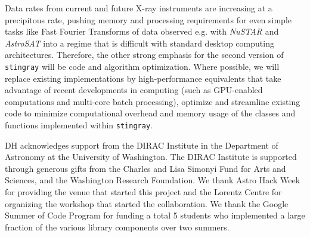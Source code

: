 \documentclass[twocolumn]{aastex62}
\newcommand{\stingray}{\texttt{stingray}\xspace}
\begin{document}
Data rates from current and future X-ray instruments are increasing at a precipitous rate, pushing memory and processing requirements for even simple tasks like Fast Fourier Transforms of data observed e.g. with \textit{NuSTAR} and \textit{AstroSAT} \citep{singh2014} into a regime that is difficult with standard desktop computing architectures. Therefore, the other strong emphasis for the second version of \stingray will be code and algorithm optimization. Where possible, we will replace existing implementations by high-performance equivalents that take advantage of recent developments in computing (such as GPU-enabled computations and multi-core batch processing), optimize and streamline existing code to minimize computational overhead and memory usage of the classes and functions implemented within \stingray. 


\acknowledgments
DH acknowledges support from the DIRAC Institute in the Department of Astronomy at the University of Washington. The DIRAC Institute is supported through generous gifts from the Charles and Lisa Simonyi Fund for Arts and Sciences, and the Washington Research Foundation.
We thank Astro Hack Week for providing the venue that started this project and the Lorentz Centre for organizing the workshop that started the collaboration. We thank the Google Summer of Code Program for funding a total 5 students who implemented a large fraction of the various library components over two summers.

%


\end{document}
